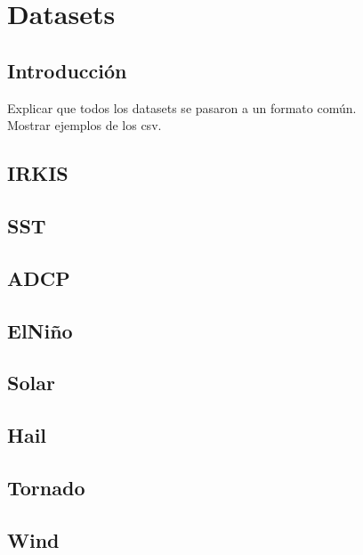 
\chapter{Datasets} %

\label{Datasets} %


\section{Introducción}
\label{secC:introduccion}

Explicar que todos los datasets se pasaron a un formato común.\\
Mostrar ejemplos de los csv.



\section{IRKIS}
\label{secC:IRKIS}

\section{SST}
\label{secC:SST}

\section{ADCP}
\label{secC:ADCP}

\section{ElNiño}
\label{secC:ElNiño}

\section{Solar}
\label{secC:Solar}

\section{Hail}
\label{secC:Hail}

\section{Tornado}
\label{secC:Tornado}

\section{Wind}
\label{secC:Wind}